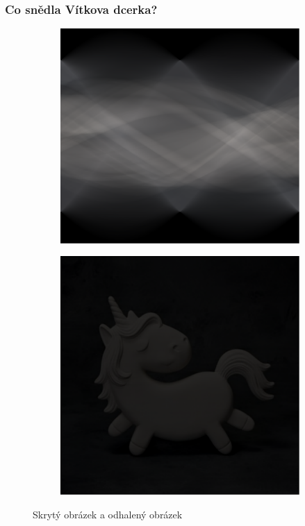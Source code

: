 \documentclass{beamer}
\begin{document}
\begin{frame}
\frametitle{Co snědla Vítkova dcerka?}

\begin{figure}
\centering
\begin{subfigure}{.5\textwidth}
  \centering
  \includegraphics[width=.8\linewidth]{secret-radon.pdf}
  \label{fig:sub1}
\end{subfigure}%
\begin{subfigure}{.5\textwidth}
  \centering
  \includegraphics[width=.8\linewidth]{unicorn.pdf}
  \label{fig:sub2}
\end{subfigure}
\caption{Skrytý obrázek a odhalený obrázek}
\label{fig:test}
\end{figure}

\end{frame}
\end{document}
